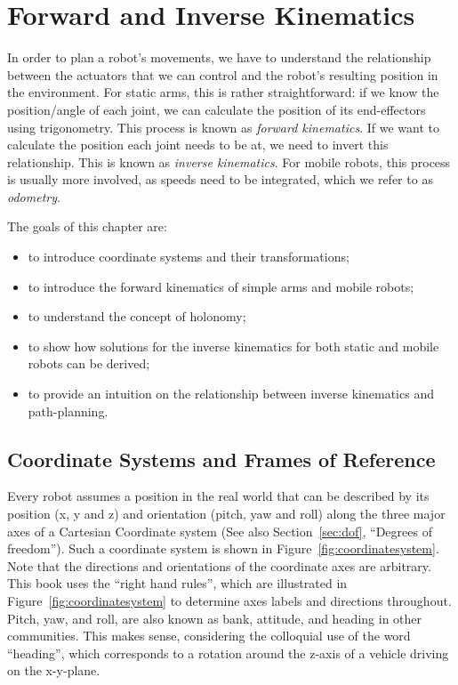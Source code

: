 \chapter{Forward and Inverse Kinematics}\label{chap:kinematics}
In order to plan a robot's movements, we have to understand the relationship between the actuators that we can control and the robot's resulting position in the environment. For static arms, this is rather straightforward: if we know the position/angle of each joint, we can calculate the position of its end-effectors using trigonometry. This process is known as \emph{forward kinematics}.  If we want to calculate the position each joint needs to be at, we need to invert this relationship. This is known as \emph{inverse kinematics}.  For mobile robots, this process is usually more involved, as speeds need to be integrated, which we refer to as \emph{odometry}.

The goals of this chapter are:

\begin{itemize}
\item to introduce coordinate systems and their transformations;
\item to introduce the forward kinematics of simple arms and mobile robots;
\item to understand the concept of holonomy;
\item to show how solutions for the inverse kinematics for both static and mobile robots can be derived;
\item to provide an intuition on the relationship between inverse kinematics and path-planning.
\end{itemize}

\section{Coordinate Systems and Frames of Reference}\label{sec:coordsystems}
Every robot assumes a position in the real world that can be described by its position (x, y and z) and orientation (pitch, yaw and roll) along the three major axes of a Cartesian Coordinate system (See also Section~\ref{sec:dof}, ``Degrees of freedom''). Such a coordinate system is shown in Figure~\ref{fig:coordinatesystem}. Note that the directions and orientations of the coordinate axes are arbitrary. This book uses the ``right hand rules'', which are illustrated in Figure~\ref{fig:coordinatesystem} to determine axes labels and directions throughout. Pitch, yaw, and roll, are also known as bank, attitude, and heading in other communities.  This makes sense, considering the colloquial use of the word ``heading'', which corresponds to a rotation around the z-axis of a vehicle driving on the x-y-plane.

